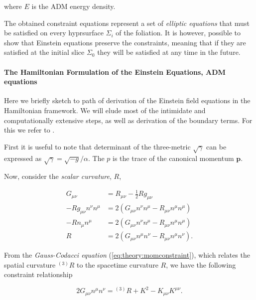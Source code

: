 {    where $E$ is the ADM energy density.
    
    The obtained constraint equations represent a set of \textit{elliptic equations} that must be satisfied on every hyprsurface $\Sigma_i$ of the foliation. 
    It is however, possible to show that Einstein equations preserve the constraints, meaning that if they are satisfied at the initial slice $\Sigma_0$ they will be satisfied at any time in the future.
    
    
    \paragraph{The Hamiltonian Formulation of the Einstein Equations, ADM equations}
    
    
    
    
    Here we briefly sketch to path of derivation of the Einstein field equations in the Hamiltonian framework. We will elude most of the intimidate and computationally extensive steps, as well as derivation of the boundary terms. For this we refer to \cite{Poisson:2004}.
    
    First it is useful to note that determinant of the three-metric $\sqrt{\gamma}$ can be expressed as $\sqrt{\gamma}=\sqrt{-g}/\alpha$. 
    The $p$ is the trace of the canonical momentum $\boldsymbol{p}$.
    
    Now, consider the \textit{scalar curvature}, $R$,
    
    \begin{align}
        G_{\mu\nu} &= R_{\mu\nu} - \frac{1}{2}Rg_{\mu\nu} \\
        -Rg_{\mu\nu}n^{\nu}n^{\mu} &= 2(G_{\mu\nu} n^{\nu}n^{\mu}-R_{\mu\nu}n^{\mu}n^{\mu})\\
        -Rn_{\mu}n^{\mu}& = 2(G_{\mu\nu}n^{\nu}n^{\mu} - R_{\mu\nu}n^{\mu}n^{\mu}) \\
        R &= 2(G_{\mu\nu}n^{\mu}n^{\nu} - R_{\mu\nu}n^{\mu}n^{\nu}).
    \end{align}
    
    From the \textit{Gauss-Codacci equation} (\ref{eq:theory:momconstraint}), which relates the spatial curvature $^{(3)}R$ to the spacetime curvature $R$, we have the following constraint relationship
    
    \begin{equation}
        2G_{\mu\nu}n^{\mu}n^{\nu} = {^{(3)}R} + K^2 - K_{\mu\nu}K^{\mu\nu}.
    \end{equation}
    
}
